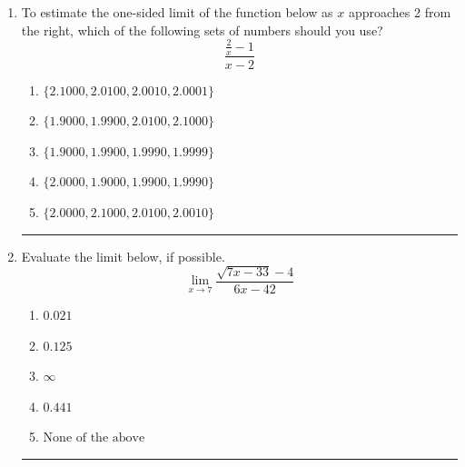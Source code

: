 \documentclass[14pt]{extbook}
\newcommand{\litem}[1]{\item#1\hspace*{-1cm}\rule{\textwidth}{0.4pt}}
\begin{document}
\begin{enumerate}
{\begin{enumerate}[label=\Alph*.]
\end{enumerate} }
\litem{
To estimate the one-sided limit of the function below as $x$ approaches 2 from the right, which of the following sets of numbers should you use?\[ \frac{\frac{2}{x} - 1}{x - 2} \]\begin{enumerate}[label=\Alph*.]
\item \( \{ 2.1000, 2.0100, 2.0010, 2.0001 \} \)
\item \( \{ 1.9000, 1.9900, 2.0100, 2.1000 \} \)
\item \( \{ 1.9000, 1.9900, 1.9990, 1.9999 \} \)
\item \( \{ 2.0000, 1.9000, 1.9900, 1.9990 \} \)
\item \( \{ 2.0000, 2.1000, 2.0100, 2.0010 \} \)

\end{enumerate} }
\litem{
Evaluate the limit below, if possible.\[ \lim_{x \rightarrow 7} \frac{\sqrt{7x - 33} - 4}{6x - 42} \]\begin{enumerate}[label=\Alph*.]
\item \( 0.021 \)
\item \( 0.125 \)
\item \( \infty \)
\item \( 0.441 \)
\item \( \text{None of the above} \)

\end{enumerate} }
\end{enumerate}
\end{document}
